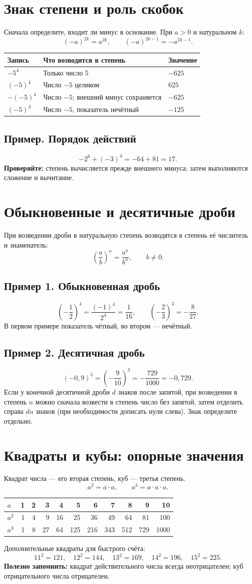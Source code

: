 \documentclass[a4paper,12pt]{article}
\newcommand{\idea}[1]{\textcolor{darkaccent}{\textbf{#1}}}
\newcommand{\ex}[1]{\subsection*{#1}}
\begin{document}
\section{Знак степени и роль скобок}
Сначала определите, входит ли минус в основание. При $a>0$ и натуральном $k$:
\[
 (-a)^{2k}=a^{2k},\qquad (-a)^{2k-1}=-a^{2k-1}.
\]
\begin{center}
\renewcommand{\arraystretch}{1.3}
\begin{tabularx}{\linewidth}{@{}lXl@{}}
\toprule
Запись & Что возводится в степень & Значение \\\midrule
$-5^4$ & Только число 5 & $-625$\\
$(-5)^4$ & Число $-5$ целиком & $625$\\
$-(-5)^4$ & Число $-5$; внешний минус сохраняется & $-625$\\
$(-5)^3$ & Число $-5$, показатель нечётный & $-125$\\
\bottomrule
\end{tabularx}
\end{center}
\ex{Пример. Порядок действий}
\[
 -2^6+(-3)^4=-64+81=17.
\]
\idea{Проверяйте:} степень вычисляется прежде внешнего минуса; затем выполняются сложение и вычитание.
\clearpage
\section{Обыкновенные и десятичные дроби}
При возведении дроби в натуральную степень возводятся в степень её числитель и знаменатель:
\[
 \left(\frac{a}{b}\right)^n=\frac{a^n}{b^n},\qquad b\ne0.
\]
\ex{Пример 1. Обыкновенная дробь}
\[
 \left(-\frac12\right)^4=\frac{(-1)^4}{2^4}=\frac1{16},\qquad
 \left(-\frac23\right)^3=-\frac8{27}.
\]
В первом примере показатель чётный, во втором --- нечётный.
\ex{Пример 2. Десятичная дробь}
\[
 (-0,9)^3=\left(-\frac9{10}\right)^3=-\frac{729}{1000}=-0,729.
\]
Если у конечной десятичной дроби $d$ знаков после запятой, при возведении в степень $n$ можно сначала возвести в степень число без запятой, затем отделить справа $dn$ знаков (при необходимости дописать нули слева). Знак определите отдельно.
\section{Квадраты и кубы: опорные значения}
Квадрат числа --- его вторая степень, куб --- третья степень.
\[
 a^2=a\cdot a,\qquad a^3=a\cdot a\cdot a.
\]
\begin{center}
\renewcommand{\arraystretch}{1.25}
\begin{tabular}{@{}lrrrrrrrrrr@{}}
\toprule
$a$ &1&2&3&4&5&6&7&8&9&10\\\midrule
$a^2$ &1&4&9&16&25&36&49&64&81&100\\
$a^3$ &1&8&27&64&125&216&343&512&729&1000\\\bottomrule
\end{tabular}
\end{center}
Дополнительные квадраты для быстрого счёта:
\[
 11^2=121,\quad 12^2=144,\quad 13^2=169,\quad 14^2=196,\quad 15^2=225.
\]
\idea{Полезно запомнить:} квадрат действительного числа всегда неотрицателен; куб отрицательного числа отрицателен.
\clearpage
\end{document}
